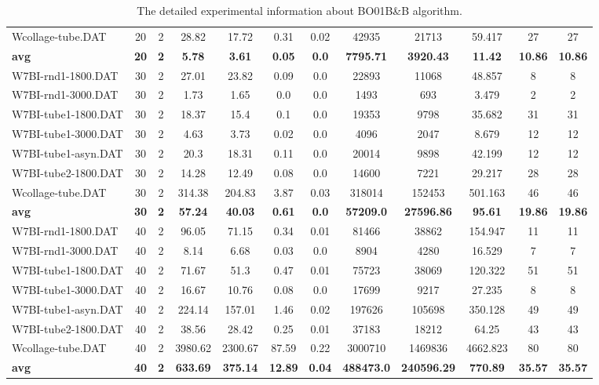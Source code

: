 \begin{table}[!h]
{\begin{tabular}{lccccccccccc}
Wcollage-tube.DAT & 20 & 2 & 28.82 & 17.72 & 0.31 & 0.02 & 42935 & 21713 & 59.417 & 27 & 27\\
\cline{1-12} \textbf{avg} & \textbf{20} & \textbf{2} & \textbf{5.78} & \textbf{3.61} & \textbf{0.05} & \textbf{0.0} & \textbf{7795.71} & \textbf{3920.43} & \textbf{11.42} & \textbf{10.86} & \textbf{10.86} \\ \cline{1-12}
W7BI-rnd1-1800.DAT & 30 & 2 & 27.01 & 23.82 & 0.09 & 0.0 & 22893 & 11068 & 48.857 & 8 & 8\\
W7BI-rnd1-3000.DAT & 30 & 2 & 1.73 & 1.65 & 0.0 & 0.0 & 1493 & 693 & 3.479 & 2 & 2\\
W7BI-tube1-1800.DAT & 30 & 2 & 18.37 & 15.4 & 0.1 & 0.0 & 19353 & 9798 & 35.682 & 31 & 31\\
W7BI-tube1-3000.DAT & 30 & 2 & 4.63 & 3.73 & 0.02 & 0.0 & 4096 & 2047 & 8.679 & 12 & 12\\
W7BI-tube1-asyn.DAT & 30 & 2 & 20.3 & 18.31 & 0.11 & 0.0 & 20014 & 9898 & 42.199 & 12 & 12\\
W7BI-tube2-1800.DAT & 30 & 2 & 14.28 & 12.49 & 0.08 & 0.0 & 14600 & 7221 & 29.217 & 28 & 28\\
Wcollage-tube.DAT & 30 & 2 & 314.38 & 204.83 & 3.87 & 0.03 & 318014 & 152453 & 501.163 & 46 & 46\\
\cline{1-12} \textbf{avg} & \textbf{30} & \textbf{2} & \textbf{57.24} & \textbf{40.03} & \textbf{0.61} & \textbf{0.0} & \textbf{57209.0} & \textbf{27596.86} & \textbf{95.61} & \textbf{19.86} & \textbf{19.86} \\ \cline{1-12}
W7BI-rnd1-1800.DAT & 40 & 2 & 96.05 & 71.15 & 0.34 & 0.01 & 81466 & 38862 & 154.947 & 11 & 11\\
W7BI-rnd1-3000.DAT & 40 & 2 & 8.14 & 6.68 & 0.03 & 0.0 & 8904 & 4280 & 16.529 & 7 & 7\\
W7BI-tube1-1800.DAT & 40 & 2 & 71.67 & 51.3 & 0.47 & 0.01 & 75723 & 38069 & 120.322 & 51 & 51\\
W7BI-tube1-3000.DAT & 40 & 2 & 16.67 & 10.76 & 0.08 & 0.0 & 17699 & 9217 & 27.235 & 8 & 8\\
W7BI-tube1-asyn.DAT & 40 & 2 & 224.14 & 157.01 & 1.46 & 0.02 & 197626 & 105698 & 350.128 & 49 & 49\\
W7BI-tube2-1800.DAT & 40 & 2 & 38.56 & 28.42 & 0.25 & 0.01 & 37183 & 18212 & 64.25 & 43 & 43\\
Wcollage-tube.DAT & 40 & 2 & 3980.62 & 2300.67 & 87.59 & 0.22 & 3000710 & 1469836 & 4662.823 & 80 & 80\\
\cline{1-12} \textbf{avg} & \textbf{40} & \textbf{2} & \textbf{633.69} & \textbf{375.14} & \textbf{12.89} & \textbf{0.04} & \textbf{488473.0} & \textbf{240596.29} & \textbf{770.89} & \textbf{35.57} & \textbf{35.57} \\ \cline{1-12}
\bottomrule
\end{tabular}%
}%
\caption{The detailed experimental information about BO01B\&B algorithm.}
\label{tab:table_bb}
\end{table}

